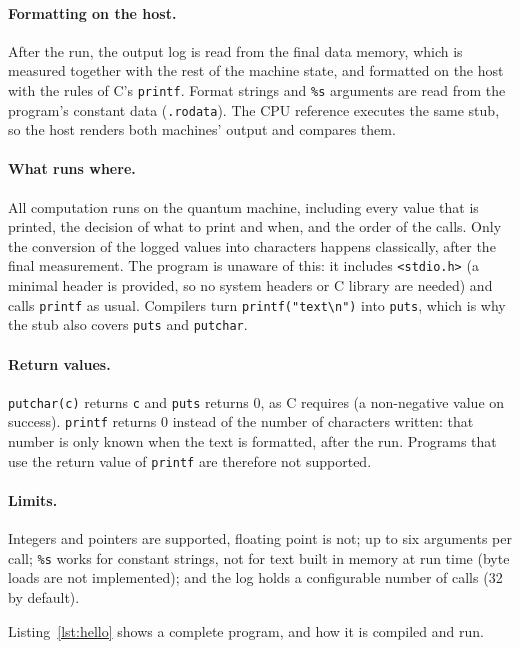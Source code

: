 \documentclass[11pt]{article}
\begin{document}
\paragraph{Formatting on the host.} After the run, the output log is read from the final data
memory, which is measured together with the rest of the machine state, and formatted on the
host with the rules of C's \texttt{printf}. Format strings and \texttt{\%s} arguments are read
from the program's constant data (\texttt{.rodata}). The CPU reference executes the same stub,
so the host renders both machines' output and compares them.

\paragraph{What runs where.} All computation runs on the quantum machine, including every value
that is printed, the decision of what to print and when, and the order of the calls. Only the
conversion of the logged values into characters happens classically, after the final
measurement. The program is unaware of this: it includes \texttt{<stdio.h>} (a minimal header
is provided, so no system headers or C library are needed) and calls \texttt{printf} as usual.
Compilers turn \texttt{printf("text\textbackslash n")} into \texttt{puts}, which is why the
stub also covers \texttt{puts} and \texttt{putchar}.

\paragraph{Return values.} \texttt{putchar(c)} returns \texttt{c} and \texttt{puts} returns 0, as C
requires (a non-negative value on success). \texttt{printf} returns 0 instead of the number of characters
written: that number is only known when the text is formatted, after the run. Programs that use the
return value of \texttt{printf} are therefore not supported.

\paragraph{Limits.} Integers and pointers are supported, floating point is not; up to six
arguments per call; \texttt{\%s} works for constant strings, not for text built in memory at run
time (byte loads are not implemented); and the log holds a configurable number of calls
(32 by default).

Listing~\ref{lst:hello} shows a complete program, and how it is compiled and run.
\end{document}
